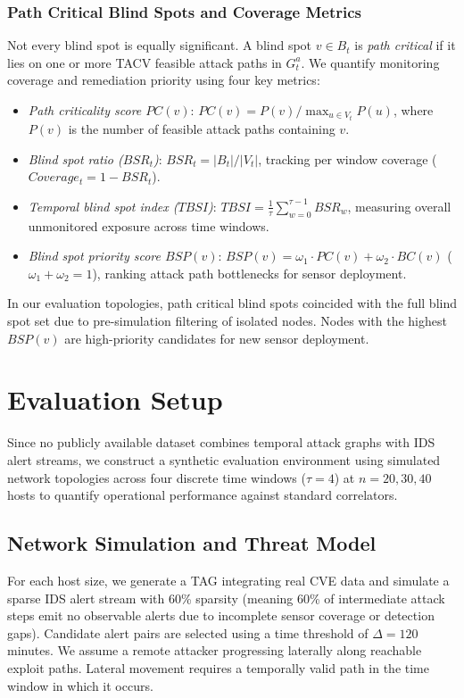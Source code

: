 \documentclass[runningheads]{llncs}
\begin{document}
\subsubsection{Path Critical Blind Spots and Coverage Metrics}
Not every blind spot is equally significant. A blind spot $v \in B_t$ is \emph{path critical} if it lies on one or more TACV feasible attack paths in $G_t^a$. We quantify monitoring coverage and remediation priority using four key metrics:
\begin{itemize}\setlength{\itemsep}{1pt}\setlength{\parskip}{0pt}
	\item \emph{Path criticality score $PC(v)$}: $PC(v) = P(v) / \max_{u \in V_t} P(u)$, where $P(v)$ is the number of feasible attack paths containing $v$.
	\item \emph{Blind spot ratio ($BSR_t$)}: $BSR_t = |B_t| / |V_t|$, tracking per window coverage ($Coverage_t = 1 - BSR_t$).
	\item \emph{Temporal blind spot index ($TBSI$)}: $TBSI = \frac{1}{\tau}\sum_{w=0}^{\tau-1} BSR_w$, measuring overall unmonitored exposure across time windows.
	\item \emph{Blind spot priority score $BSP(v)$}: $BSP(v) = \omega_1 \cdot PC(v) + \omega_2 \cdot BC(v)$ ($\omega_1 + \omega_2 = 1$), ranking attack path bottlenecks for sensor deployment.
\end{itemize}
In our evaluation topologies, path critical blind spots coincided with the full blind spot set due to pre-simulation filtering of isolated nodes. Nodes with the highest $BSP(v)$ are high-priority candidates for new sensor deployment.

\section{Evaluation Setup}
\label{sec:setup}

Since no publicly available dataset combines temporal attack graphs with IDS alert streams, we construct a synthetic evaluation environment using simulated network topologies across four discrete time windows ($\tau=4$) at $n = 20, 30, 40$ hosts to quantify operational performance against standard correlators.

\subsection{Network Simulation and Threat Model}
For each host size, we generate a TAG integrating real CVE data and simulate a sparse IDS alert stream with 60\% sparsity (meaning 60\% of intermediate attack steps emit no observable alerts due to incomplete sensor coverage or detection gaps). Candidate alert pairs are selected using a time threshold of $\Delta = 120$ minutes. We assume a remote attacker progressing laterally along reachable exploit paths. Lateral movement requires a temporally valid path in the time window in which it occurs.
\end{document}
